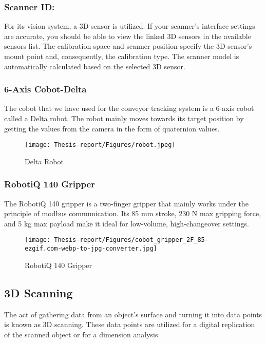 \documentclass[12pt]{article}
\begin{document}
\subsubsection{Scanner ID:} For its vision system, a 3D sensor is utilized.  If your scanner's interface settings are accurate, you should be able to view the linked 3D sensors in the available sensors list.
The calibration space and scanner position specify the 3D sensor's mount point and, consequently, the calibration type. The scanner model is automatically calculated based on the selected 3D sensor\cite{ref2}.



\subsubsection{6-Axis Cobot-Delta}
The cobot that we have used for the conveyor tracking system is a 6-axis cobot called a Delta robot. The robot mainly moves towards its target position by getting the values from the camera in the form of quaternion values\cite{ref2}.

\begin{figure}[H]
  \centering
  \texttt{[image: Thesis-report/Figures/robot.jpeg]}
  \caption{Delta Robot}
  \label{fig:delta_robot}
\end{figure}


\subsubsection{RobotiQ 140 Gripper}
The RobotiQ 140 gripper is a two-finger gripper that mainly works under the principle of modbus communication. Its 85 mm stroke, 230 N max gripping force, and 5 kg max payload make it ideal for low-volume, high-changeover settings.

\begin{figure}[H]
  \centering
  \texttt{[image: Thesis-report/Figures/cobot\_gripper\_2F\_85-ezgif.com-webp-to-jpg-converter.jpg]}
  \caption{RobotiQ 140 Gripper\cite{ref26}}
  \label{fig:robotiq_140}
\end{figure}

\subsection{3D Scanning}
The act of gathering data from an object's surface and turning it into data points is known as 3D scanning. These data points are utilized for a digital replication of the scanned object or for a dimension analysis\cite{ref17}.\\
\end{document}
